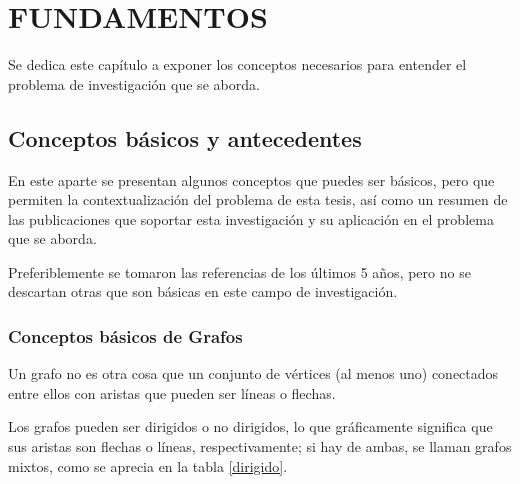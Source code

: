\chapter{FUNDAMENTOS}
\label{chap:Mt}
Se dedica este capítulo a exponer los conceptos necesarios para entender el problema de investigación que se aborda.

\section{Conceptos básicos y antecedentes}

En este aparte se presentan algunos conceptos que puedes ser básicos, pero que permiten la contextualización del problema de esta tesis, así como un resumen de las publicaciones que soportar esta investigación y su aplicación en el problema que se aborda.

Preferiblemente se tomaron las referencias de los últimos 5 años, pero no se descartan otras que son básicas en este campo de investigación.

\subsection{Conceptos básicos de Grafos}
\label{ConcepGraph}
Un grafo no es otra cosa que un conjunto de vértices (al menos uno) conectados entre ellos con aristas que pueden ser líneas o flechas. 

Los grafos pueden ser dirigidos o no dirigidos, lo que gráficamente significa que sus aristas son flechas o líneas, respectivamente; si hay de ambas, se llaman grafos mixtos, como se aprecia en la tabla \ref{dirigido}.

